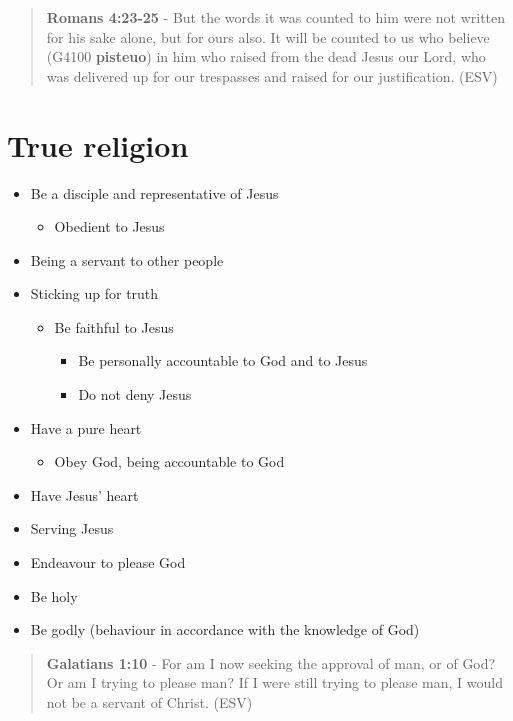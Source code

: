 \documentclass[11pt]{article}
\begin{document}
\begin{quote}
\textbf{Romans 4:23-25} - But the words it was counted to him were not written for his sake alone, but for ours also. It will be counted to us who believe (G4100 \textbf{pisteuo}) in him who raised from the dead Jesus our Lord, who was delivered up for our trespasses and raised for our justification. (ESV)
\end{quote}

\section{True religion}
\label{sec:org1498ac1}
\begin{itemize}
\item Be a disciple and representative of Jesus
\begin{itemize}
\item Obedient to Jesus
\end{itemize}
\item Being a servant to other people
\item Sticking up for truth
\begin{itemize}
\item Be faithful to Jesus
\begin{itemize}
\item Be personally accountable to God and to Jesus
\item Do not deny Jesus
\end{itemize}
\end{itemize}
\item Have a pure heart
\begin{itemize}
\item Obey God, being accountable to God
\end{itemize}
\item Have Jesus' heart
\item Serving Jesus
\item Endeavour to please God
\item Be holy
\item Be godly (behaviour in accordance with the knowledge of God)
\end{itemize}

\begin{quote}
\textbf{Galatians 1:10} - For am I now seeking the approval of man, or of God? Or am I trying to please man? If I were still trying to please man, I would not be a servant of Christ. (ESV)
\end{quote}
\end{document}

